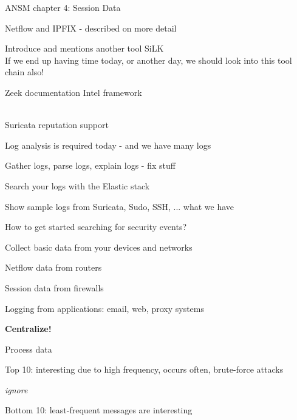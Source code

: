 \documentclass[Screen16to9,17pt]{foils}
\begin{document}

\begin{list1}
\item ANSM chapter 4: Session Data
\begin{list2}
\item Netflow and IPFIX - described on more detail
\item Introduce and mentions another tool SiLK \\
If we end up having time today, or another day, we should look into this tool chain also!
\end{list2}
\end{list1}



\begin{list1}
\item Zeek documentation Intel framework\\
\\
\item Suricata reputation support\\
\end{list1}



\begin{list1}
\item Log analysis is required today - and we have many logs
\item Gather logs, parse logs, explain logs - fix stuff
\item Search your logs with the Elastic stack
\item Show sample logs from Suricata, Sudo, SSH, ... what we have
\end{list1}



\begin{list1}
\item How to get started searching for security events?
\item Collect basic data from your devices and networks
\begin{list2}
\item Netflow data from routers
\item Session data from firewalls
\item Logging from applications: email, web, proxy systems
\end{list2}
\item {\bf Centralize!}
\item Process data
\begin{list2}
\item Top 10: interesting due to high frequency, occurs often, brute-force attacks
\item {\it ignore}
\item Bottom 10: least-frequent messages are interesting
\end{list2}
\end{list1}
\end{document}
